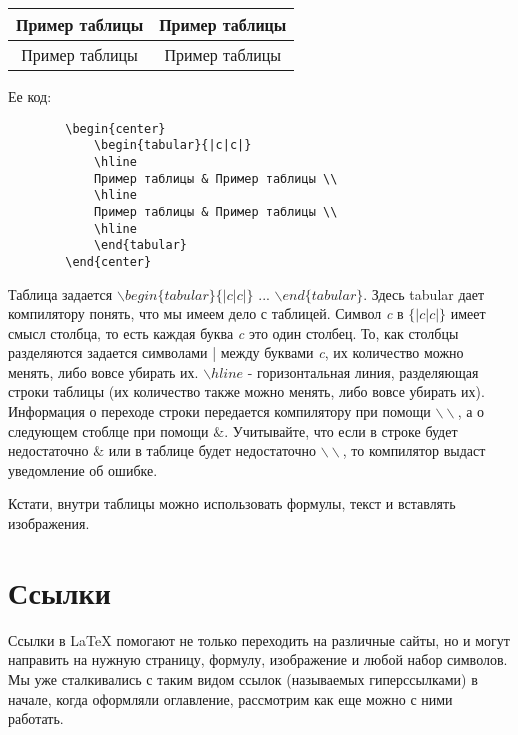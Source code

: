     \begin{center}    
        \begin{tabular}{|c|c|}
        \hline 
        Пример таблицы & Пример таблицы \\ 
        \hline 
        Пример таблицы & Пример таблицы \\ 
        \hline 
        \end{tabular}
    \end{center}
    
    \vspace{0.5cm}
    
    Ее код:    
    
    \begin{verbatim}
        \begin{center}
            \begin{tabular}{|c|c|}
            \hline 
            Пример таблицы & Пример таблицы \\ 
            \hline 
            Пример таблицы & Пример таблицы \\ 
            \hline 
            \end{tabular}
        \end{center}
    \end{verbatim}
    
    Таблица задается $\backslash begin\{tabular\}\{|c|c|\}$ ... $\backslash end\{tabular\}$. Здесь tabular дает компилятору понять, что мы имеем дело с таблицей. Символ \textit{c} в $\{|c|c|\}$ имеет смысл столбца, то есть каждая буква \textit{c} это один столбец. То, как столбцы разделяются задается символами | между буквами \textit{c}, их количество можно менять, либо вовсе убирать их. $\backslash hline$ - горизонтальная линия, разделяющая строки таблицы (их количество также можно менять, либо вовсе убирать их). Информация о переходе строки передается компилятору при помощи $\backslash \backslash$, а о следующем стоблце при помощи $\&$. Учитывайте, что если в строке будет недостаточно $\&$ или в таблице будет недостаточно $\backslash \backslash$, то компилятор выдаст уведомление об ошибке.
    
    Кстати, внутри таблицы можно использовать формулы, текст и вставлять изображения.
    
    \section{Ссылки}

    Ссылки в \LaTeX{} помогают не только переходить на различные сайты, но и могут направить на нужную страницу, формулу, изображение и любой набор символов. Мы уже сталкивались с таким видом ссылок (называемых гиперссылками) в начале, когда оформляли оглавление, рассмотрим как еще можно с ними работать.
    
